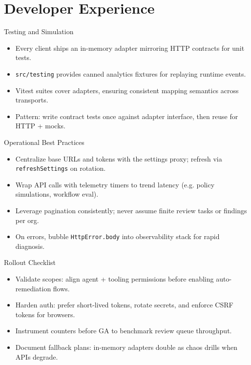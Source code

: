 \documentclass[aspectratio=169]{beamer}
\begin{document}
\section{Developer Experience}

\begin{frame}{Testing and Simulation}
  \begin{itemize}
    \item Every client ships an in-memory adapter mirroring HTTP contracts for unit tests.
    \item \texttt{src/testing} provides canned analytics fixtures for replaying runtime events.
    \item Vitest suites cover adapters, ensuring consistent mapping semantics across transports.
    \item Pattern: write contract tests once against adapter interface, then reuse for HTTP + mocks.
  \end{itemize}
\end{frame}

\begin{frame}{Operational Best Practices}
  \begin{itemize}
    \item Centralize base URLs and tokens with the settings proxy; refresh via \texttt{refreshSettings} on rotation.
    \item Wrap API calls with telemetry timers to trend latency (e.g. policy simulations, workflow eval).
    \item Leverage pagination consistently; never assume finite review tasks or findings per org.
    \item On errors, bubble \texttt{HttpError.body} into observability stack for rapid diagnosis.
  \end{itemize}
\end{frame}

\begin{frame}{Rollout Checklist}
  \begin{itemize}
    \item Validate scopes: align agent + tooling permissions before enabling auto-remediation flows.
    \item Harden auth: prefer short-lived tokens, rotate secrets, and enforce CSRF tokens for browsers.
    \item Instrument counters before GA to benchmark review queue throughput.
    \item Document fallback plans: in-memory adapters double as chaos drills when APIs degrade.
  \end{itemize}
\end{frame}
\end{document}
